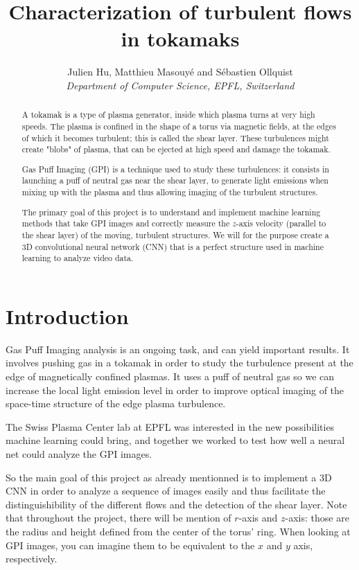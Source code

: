 \documentclass[10pt,conference]{IEEEtran}
\begin{document}
\title{Characterization of turbulent flows in tokamaks}

\author{
  Julien Hu, Matthieu Masouyé and Sébastien Ollquist\\
  \textit{Department of Computer Science, EPFL, Switzerland}
}

\maketitle

\begin{abstract}
  A tokamak is a type of plasma generator, inside which plasma turns at very high speeds. The plasma is confined in the shape of a torus via magnetic fields, at the edges of which it becomes turbulent; this is called the shear layer. These turbulences might create "blobs" of plasma, that can be ejected at high speed and damage the tokamak.\par
  Gas Puff Imaging (GPI) is a technique used to study these turbulences: it consists in launching a puff of neutral gas near the shear layer, to generate light emissions when mixing up with the plasma and thus allowing imaging of the turbulent structures.\par
  The primary goal of this project is to understand and implement machine learning methods that take GPI images and correctly measure the $z$-axis velocity (parallel to the shear layer) of the moving, turbulent structures. We will for the purpose create a 3D convolutional neural network (CNN) that is a perfect structure used in machine learning to analyze video data.
\end{abstract}

\section{Introduction}
Gas Puff Imaging analysis is an ongoing task, and can yield important results. It involves pushing gas in a tokamak in order to study the turbulence present at the edge of magnetically confined plasmas. It uses a puff of neutral gas so we can increase the local light emission level in order to improve optical imaging of the space-time structure of the edge plasma turbulence.\par
The Swiss Plasma Center lab at EPFL was interested in the new possibilities machine learning could bring, and together we worked to test how well a neural net could analyze the GPI images.\par
So the main goal of this project as already mentionned is to implement a 3D CNN in order to analyze a sequence of images easily and thus facilitate the distinguishibility of the different flows and the detection of the shear layer. Note that throughout the project, there will be mention of $r$-axis and $z$-axis: those are the radius and height defined from the center of the torus' ring. When looking at GPI images, you can imagine them to be equivalent to the $x$ and $y$ axis, respectively.
\end{document}
